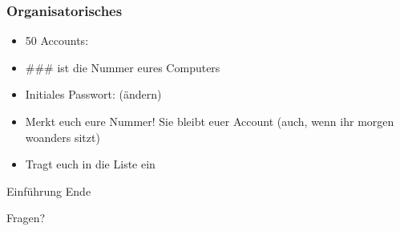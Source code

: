 \begin{frame}
    \frametitle{Organisatorisches}
    \begin{itemize}
        \item 50 Accounts: \texttt{}
        \pause\item \#\#\# ist die Nummer eures Computers
        \pause\item Initiales Passwort: \texttt{} (ändern)
        \pause\item Merkt euch eure Nummer! Sie bleibt euer Account (auch, wenn
            ihr morgen woanders sitzt)
        \pause\item Tragt euch in die Liste ein
    \end{itemize}
\end{frame}

\begin{frame}
    \begin{center}
        \Huge Einführung Ende
    \end{center}
    \begin{center}
        \pause\Huge Fragen?
    \end{center}
\end{frame}


